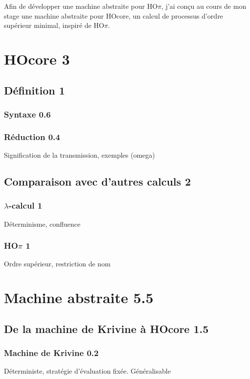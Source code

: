 \documentclass[11pt]{article}
\newcounter{c_theo}
\newcounter{c_def}
\begin{document}
Afin de développer une machine abstraite pour HO$\pi$, j'ai conçu au cours de mon stage une machine abstraite pour HOcore\cite{Lanese08}, un calcul de processus d'ordre supérieur minimal, inspiré de HO$\pi$.



\section{HOcore 3}
\label{sec-2}
\subsection{Définition 1}
\label{sec-2-1}
\subsubsection{Syntaxe 0.6}
\label{sec-2-1-1}
\subsubsection{Réduction 0.4}
\label{sec-2-1-2}
Signification de la transmission, exemples (omega)
\subsection{Comparaison avec d'autres calculs 2}
\label{sec-2-2}
\subsubsection{$\lambda$-calcul 1}
\label{sec-2-2-1}
Déterminisme, confluence
\subsubsection{HO$\pi$ 1}
\label{sec-2-2-2}
Ordre supérieur, restriction de nom


\section{Machine abstraite 5.5}
\label{sec-3}
\subsection{De la machine de Krivine à HOcore 1.5}
\label{sec-3-1}
\subsubsection{Machine de Krivine 0.2}
\label{sec-3-1-1}
Déterministe, stratégie d'évaluation fixée. Généralisable
\end{document}
